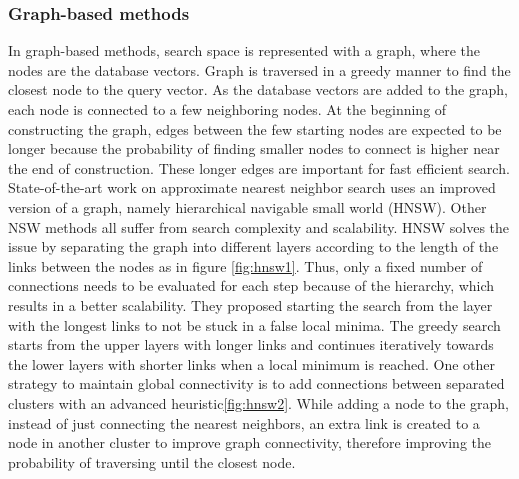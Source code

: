 \subsubsection*{Graph-based methods}

In graph-based methods, search space is represented with a graph, where the nodes are the database vectors. 
Graph is traversed in a greedy manner to find the closest node to the query vector.
As the database vectors are added to the graph, each node is connected to a few neighboring nodes.
At the beginning of constructing the graph, edges between the few starting nodes are expected to be longer because the probability of finding smaller nodes to connect is higher near the end of construction.
These longer edges are important for fast efficient search.
State-of-the-art work on approximate nearest neighbor search uses an improved version of a graph, namely hierarchical navigable small world (HNSW)\cite{malkov2018efficient}. 
Other NSW methods all suffer from search complexity and scalability. 
HNSW solves the issue by separating the graph into different layers according to the length of the links between the nodes as in figure \ref{fig:hnsw1}. 
Thus, only a fixed number of connections needs to be evaluated for each step because of the hierarchy, which results in a better scalability.
They proposed starting the search from the layer with the longest links to not be stuck in a false local minima. 
The greedy search starts from the upper layers with longer links and continues iteratively towards the lower layers with shorter links when a local minimum is reached.
One other strategy to maintain global connectivity is to add connections between separated clusters with an advanced heuristic\ref{fig:hnsw2}. 
While adding a node to the graph, instead of just connecting the nearest neighbors, an extra link is created to a node in another cluster to improve graph connectivity, therefore improving the probability of traversing until the closest node.

